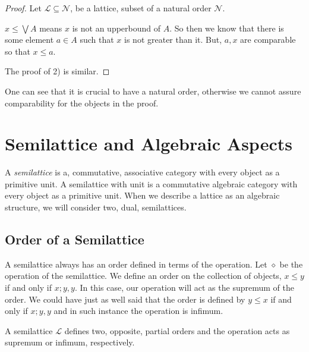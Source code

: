 \documentclass [12pt]{book}
\begin{document}
\begin{proof}Let $\mathcal L\subseteq\mathcal N$, be a lattice, subset of a natural order $\mathcal N$.

$x\leq\bigvee A$ means $x$ is not an upperbound of $A$. So then we know that there is some element $a\in A$ such that $x$ is not greater than it. But, $a,x$ are comparable so that $x\leq a$.

The proof of 2) is similar.
\end{proof}

One can see that it is crucial to have a natural order, otherwise we cannot assure comparability for the objects in the proof.


		\section{Semilattice and Algebraic Aspects}

A \textit{semilattice} is a, commutative, associative category with every object as a primitive unit. A semilattice with unit is a commutative algebraic category with every object as a primitive unit. When we describe a lattice as an algebraic structure, we will consider two, dual, semilattices. 

			\subsection{Order of a Semilattice}

A semilattice always has an order defined in terms of the operation. Let $\diamond$ be the operation of the semilattice. We define an order on the collection of objects, $x\leq y$ if and only if $x;y,y$. In this case, our operation will act as the supremum of the order. We could have just as well said that the order is defined by $y\leq x$ if and only if $x;y,y$ and in such instance the operation is infimum. 

\begin{proposition}A semilattice $\mathcal L$ defines two, opposite, partial orders and the operation acts as supremum or infimum, respectively.\label{sup semi}\end{proposition}
\end{document}
